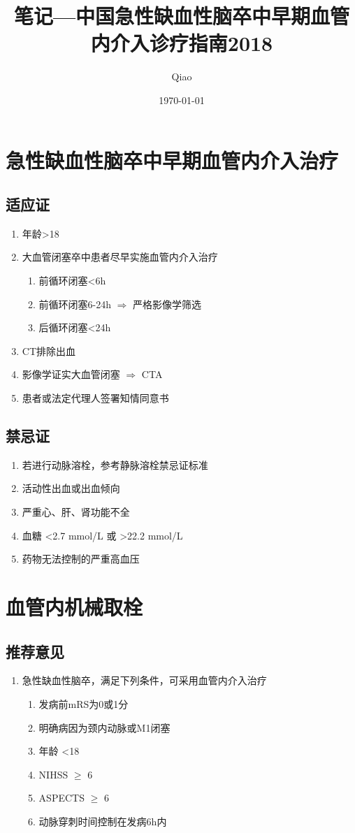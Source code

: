 \documentclass[UTF8]{ctexart}
\begin{document}
\title{笔记---中国急性缺血性脑卒中早期血管内介入诊疗指南2018}
\author{Qiao}
\date{\today}

\maketitle

\section{急性缺血性脑卒中早期血管内介入治疗}

	\subsection{适应证}
		\begin{enumerate}
			\item 年龄>18
			\item 大血管闭塞卒中患者尽早实施血管内介入治疗
			\begin{enumerate}
				\item 前循环闭塞<6h
				\item 前循环闭塞6-24h $\Rightarrow$ 严格影像学筛选
				\item 后循环闭塞<24h
			\end{enumerate}
			\item CT排除出血
			\item 影像学证实大血管闭塞 $\Rightarrow$ CTA
			\item 患者或法定代理人签署知情同意书
		\end{enumerate}
	
	\subsection{禁忌证}
		\begin{enumerate}
			\item 若进行动脉溶栓，参考静脉溶栓禁忌证标准
			\item 活动性出血或出血倾向
			\item 严重心、肝、肾功能不全
			\item 血糖 <2.7 mmol/L 或 >22.2 mmol/L
			\item 药物无法控制的严重高血压
		\end{enumerate}

\section{血管内机械取栓}

	\subsection{推荐意见}
		\begin{enumerate}
			\item 急性缺血性脑卒，满足下列条件，可采用血管内介入治疗
			\begin{enumerate}
				\item 发病前mRS为0或1分
				\item 明确病因为颈内动脉或M1闭塞
				\item 年龄 \textless 18
				\item NIHSS $\geq$ 6
				\item ASPECTS $\geq$ 6
				\item 动脉穿刺时间控制在发病6h内
			\end{enumerate}
		\end{enumerate}
\end{document}
